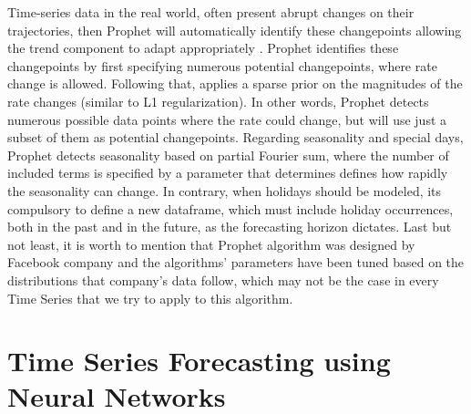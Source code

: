 \par Time-series data in the real world, often present abrupt changes on their trajectories, then Prophet will automatically identify these changepoints allowing the trend component to adapt appropriately \cite{chen2009overview}. Prophet identifies these changepoints by first specifying numerous potential changepoints, where rate change is allowed. Following that, applies a sparse prior on the magnitudes of the rate changes (similar to L1 regularization). In other words, Prophet detects numerous possible data points where the rate could change, but will use just a subset of them as potential changepoints. Regarding seasonality and special days, Prophet detects seasonality based on partial Fourier sum, where the number of included terms is specified by a parameter that determines defines how rapidly the seasonality can change. In contrary, when holidays should be modeled, its compulsory to define a new dataframe, which must include holiday occurrences, both in the past and in the future, as the forecasting horizon dictates. Last but not least, it is worth to mention that Prophet algorithm was designed by Facebook company and the algorithms' parameters have been tuned based on the distributions that company's data follow, which may not be the case in every Time Series that we try to apply to this algorithm. 
\chapter{Time Series Forecasting using Neural Networks}
